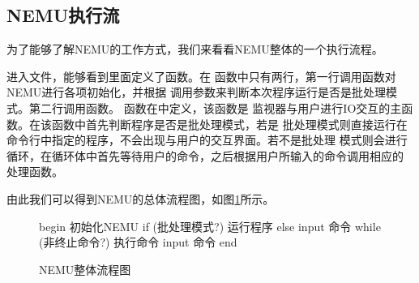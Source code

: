 \subsection{NEMU执行流}
为了能够了解NEMU的工作方式，我们来看看NEMU整体的一个执行流程。

进入文件，能够看到里面定义了函数。在
函数中只有两行，第一行调用函数对NEMU进行各项初始化，并根据
调用参数来判断本次程序运行是否是批处理模式。第二行调用函数。
函数在中定义，该函数是
监视器与用户进行IO交互的主函数。在该函数中首先判断程序是否是批处理模式，若是
批处理模式则直接运行在命令行中指定的程序，不会出现与用户的交互界面。若不是批处理
模式则会进行循环，在循环体中首先等待用户的命令，之后根据用户所输入的命令调用相应的
处理函数。

由此我们可以得到NEMU的总体流程图，如图\ref{fig:nemu-flowchart}所示。

\begin{figure}[!htbp]
\centering
\begin{autoflow}
begin
初始化NEMU
if (批处理模式?)
{
  运行程序
}
else
{
  input 命令
  while (非终止命令?)
  {
    执行命令
    input 命令
  }
}
end
\end{autoflow}
\caption{NEMU整体流程图}\label{fig:nemu-flowchart}  
\end{figure}

